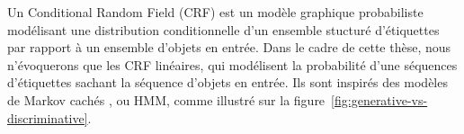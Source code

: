 \documentclass[PhD-Yoann-Dupont.tex]{subfiles}
\begin{document}
Un Conditional Random Field (CRF) \citep{Lafferty01} est un modèle graphique probabiliste \citep{koller2009probabilistic,gaussier2011modeles} modélisant une distribution conditionnelle d'un ensemble stucturé d'étiquettes par rapport à un ensemble d'objets en entrée. Dans le cadre de cette thèse, nous n'évoquerons que les CRF linéaires, qui modélisent la probabilité d'une séquences d'étiquettes sachant la séquence d'objets en entrée. Ils sont inspirés des modèles de Markov cachés \citep{baum1966statistical}, ou HMM, comme illustré sur la figure\ \ref{fig:generative-vs-discriminative}.
\end{document}
